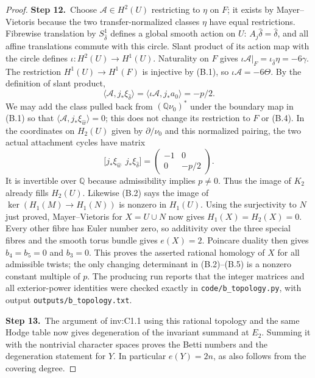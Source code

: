 \documentclass[11pt,a4paper]{article}
\theoremstyle{plain}
\theoremstyle{definition}
\begin{document}
\begin{proof}
\par\smallskip\noindent\textbf{Step 12.}\ Choose $\mathcal A\in H^2(U)$ restricting to $\eta$ on $F$;
it exists by Mayer--Vietoris because the two transfer-normalized
classes $\eta$ have equal restrictions. Fibrewise translation by
$S^1_{\hat\delta}$ defines a global smooth action on $U$:
$A_j\hat\delta=\hat\delta$, and all affine translations commute
with this circle. Slant product of its action map with the circle
defines $\iota:H^2(U)\to H^1(U)$. Naturality on $F$ gives
$\iota\mathcal A|_F=\iota_{\hat\delta}\eta=-6\gamma$.
The restriction $H^1(U)\to H^1(F)$ is injective by (B.1), so
$\iota\mathcal A=-6\Theta$. By the definition of slant product,
\[
 \langle\mathcal A,j_*\xi_{\hat\delta}\rangle
 =\langle\iota\mathcal A,j_*a_0\rangle=-p/2.           \tag{B.4}
\]
We may add the class pulled back from $(\mathbb Q\nu_0)^*$ under
the boundary map in (B.1) so that
$\langle\mathcal A,j_*\xi_{\hat w}\rangle=0$;
this does not change its restriction to $F$ or (B.4).
In the coordinates on $H_2(U)$ given by $\partial/\nu_0$ and
this normalized pairing, the two actual attachment cycles have
matrix
\[
 \bigl[j_*\xi_{\hat w}\ \ j_*\xi_{\hat\delta}\bigr]
 =\begin{pmatrix}-1&0\\0&-p/2\end{pmatrix}.             \tag{B.5}
\]
It is invertible over $\mathbb Q$ because admissibility implies
$p\ne0$. Thus the image of $K_2$ already fills $H_2(U)$.
Likewise (B.2) says the image of $\ker(H_1(M)\to H_1(N))$
is nonzero in $H_1(U)$. Using the surjectivity to $N$ just proved,
Mayer--Vietoris for $X=U\cup N$ now gives $H_1(X)=H_2(X)=0$.
Every other fibre has Euler number zero, so additivity over the
three special fibres and the smooth torus bundle gives $e(X)=2$.
Poincare duality then gives $b_4=b_5=0$ and $b_3=0$.
This proves the asserted rational homology of $X$ for all admissible
twists; the only changing determinant in (B.2)--(B.5) is a nonzero
constant multiple of $p$. The producing run reports that the integer matrices and all exterior-power identities were checked exactly in \texttt{code/b\_topology.py},
with output \texttt{outputs/b\_topology.txt}.

\par\smallskip\noindent\textbf{Step 13.}\ The argument of inv:C1.1 using this rational topology and the same Hodge
table now gives degeneration of the invariant summand at $E_2$.
Summing it with the nontrivial character spaces proves the Betti
numbers and the degeneration statement for $Y$. In particular
$e(Y)=2n$, as also follows from the covering degree.
\end{proof}
\end{document}
